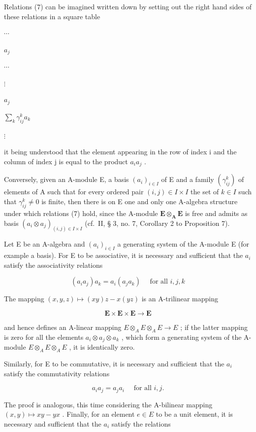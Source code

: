 Relations (7) can be imagined written down by setting out the right hand sides of these relations in a square table

\(\cdots\)

\(a_j\)

\(\cdots\)

\(\vdots\)

\(a_j\)

\(\sum_{k} \gamma_{ij}^{k} a_k\)

\(\vdots\)

it being understood that the element appearing in the row of index i and the column of index j is equal to the product \(a_{i}a_{j}\) .

Conversely, given an A-module E, a basis \((a_{i})_{i\in I}\) of E and a family \((\gamma_{ij}^{k})\) of elements of A such that for every ordered pair \((i,j)\in I\times I\) the set of \(k\in I\) such that \(\gamma_{ij}^{k}\neq 0\) is finite, then there is on E one and only one A-algebra structure under which relations (7) hold, since the A-module \(\mathbf{E}\otimes_{\mathbf{A}}\mathbf{E}\) is free and admits as basis \((a_{i}\otimes a_{j})_{(i,j)\in I\times I}\) (cf.~II, § 3, no. 7, Corollary 2 to Proposition 7).

Let E be an A-algebra and \((a_{i})_{i\in I}\) a generating system of the A-module E (for example a basis). For E to be associative, it is necessary and sufficient that the \(a_{i}\) satisfy the associativity relations

\[
(a _ {i} a _ {j}) a _ {k} = a _ {i} (a _ {j} a _ {k}) \quad \text { for   all } i, j, k\tag{8}
\]

The mapping \((x, y, z) \mapsto (xy)z - x(yz)\) is an A-trilinear mapping

\[
\mathbf {E} \times \mathbf {E} \times \mathbf {E} \rightarrow \mathbf {E}
\]

and hence defines an A-linear mapping \(E \otimes_{A} E \otimes_{A} E \to E\) ; if the latter mapping is zero for all the elements \(a_{i} \otimes a_{j} \otimes a_{k}\) , which form a generating system of the A-module \(E \otimes_{A} E \otimes_{A} E\) , it is identically zero.

Similarly, for E to be commutative, it is necessary and sufficient that the \(a_{i}\) satisfy the commutativity relations

\[
a _ {i} a _ {j} = a _ {j} a _ {i} \quad \text { for   all } i, j.\tag{9}
\]

The proof is analogous, this time considering the A-bilinear mapping \((x,y)\mapsto xy - yx\) . Finally, for an element \(e\in E\) to be a unit element, it is necessary and sufficient that the \(a_{i}\) satisfy the relations

